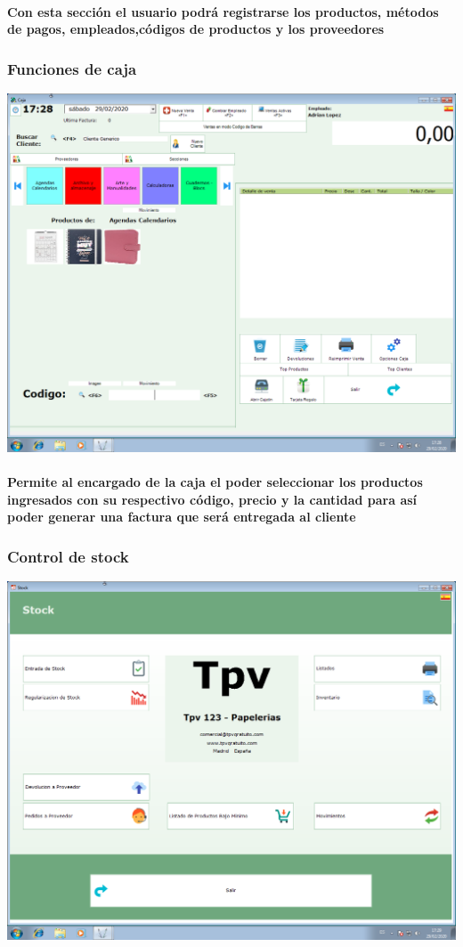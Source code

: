 \documentclass[12pt,a4paper]{article}
\begin{document}
\paragraph{Con esta sección el usuario podrá registrarse los productos, métodos de pagos, empleados,códigos de productos y los proveedores}

\subsubsection*{Funciones de caja}
\includegraphics[scale=0.35]{Caja.png} 
\paragraph{Permite al encargado de la caja el poder seleccionar los productos ingresados con su respectivo código, precio y la cantidad para así poder generar una factura que será entregada al cliente}

\subsubsection*{Control de stock}
\includegraphics[scale=0.35]{Stock.png}
\end{document}
